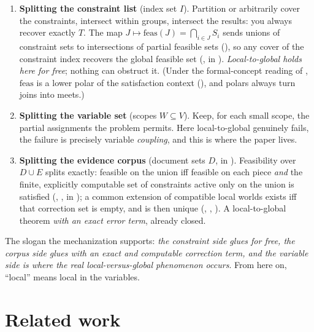 \documentclass[11pt]{article}
\newcommand{\feas}{\mathrm{feas}}
\begin{document}
\begin{enumerate}
\item \textbf{Splitting the constraint list} (index set $I$).
  Partition or arbitrarily cover the constraints, intersect within
  groups, intersect the results: you always recover exactly $T$.  The
  map $J \mapsto \feas(J) = \bigcap_{i \in J} S_i$ sends unions of
  constraint sets to intersections of partial feasible sets
  (), so any cover of the
  constraint index recovers the global feasible set
  (, in ).
  \emph{Local-to-global holds here for free}; nothing can obstruct
  it.  (Under the formal-concept reading of ,
  $\feas$ is a lower polar of the satisfaction context
  \citep{ganter1999fca} (),
  and polars always turn joins into meets.)
\item \textbf{Splitting the variable set} (scopes $W \subseteq V$).
  Keep, for each small scope, the partial assignments the problem
  permits.  Here local-to-global genuinely fails, the failure is
  precisely variable \emph{coupling}, and this is where the paper
  lives.
\item \textbf{Splitting the evidence corpus} (document sets $D$, in
  ).  Feasibility over $D \cup E$ splits
  exactly: feasible on the union iff feasible on each piece
  \emph{and} the finite, explicitly computable set of constraints
  active only on the union is satisfied (,
  , in
  ); a common extension of
  compatible local worlds exists iff that correction set is empty,
  and is then unique (,
  , ).  A
  local-to-global theorem \emph{with an exact error term}, already
  closed.
\end{enumerate}

The slogan the mechanization supports: \emph{the constraint side
glues for free, the corpus side glues with an exact and computable
correction term, and the variable side is where the real
local-versus-global phenomenon occurs}.  From here on, ``local''
means local in the variables.

\section{Related work}
\label{sec:related}
\end{document}
